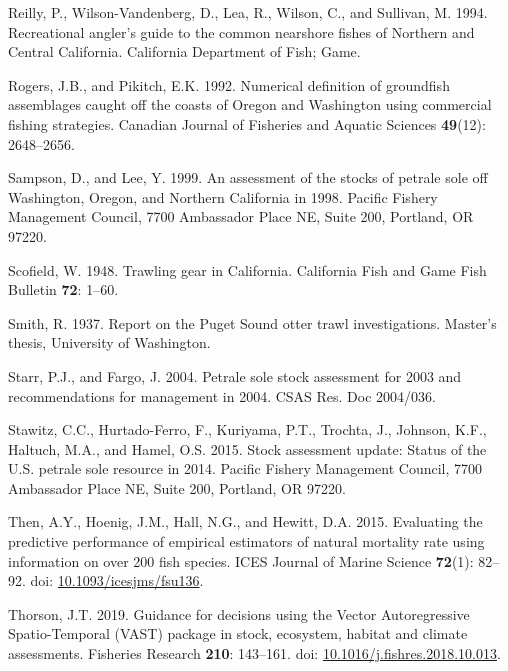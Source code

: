 \documentclass[12pt,]{article}
\begin{document}
\hypertarget{ref-reilly_recreational_1994}{}
Reilly, P., Wilson-Vandenberg, D., Lea, R., Wilson, C., and Sullivan, M.
1994. Recreational angler's guide to the common nearshore fishes of
Northern and Central California. California Department of Fish; Game.

\hypertarget{ref-rogers_numerical_1992}{}
Rogers, J.B., and Pikitch, E.K. 1992. Numerical definition of groundfish
assemblages caught off the coasts of Oregon and Washington using
commercial fishing strategies. Canadian Journal of Fisheries and Aquatic
Sciences \textbf{49}(12): 2648--2656.

\hypertarget{ref-sampson_assessment_1999}{}
Sampson, D., and Lee, Y. 1999. An assessment of the stocks of petrale
sole off Washington, Oregon, and Northern California in 1998. Pacific
Fishery Management Council, 7700 Ambassador Place NE, Suite 200,
Portland, OR 97220.

\hypertarget{ref-scofield_trawling_1948}{}
Scofield, W. 1948. Trawling gear in California. California Fish and Game
Fish Bulletin \textbf{72}: 1--60.

\hypertarget{ref-smith_report_1937}{}
Smith, R. 1937. Report on the Puget Sound otter trawl investigations.
Master's thesis, University of Washington.

\hypertarget{ref-starr_petrale_2004}{}
Starr, P.J., and Fargo, J. 2004. Petrale sole stock assessment for 2003
and recommendations for management in 2004. CSAS Res. Doc 2004/036.

\hypertarget{ref-stawitz_stock_2015}{}
Stawitz, C.C., Hurtado-Ferro, F., Kuriyama, P.T., Trochta, J., Johnson,
K.F., Haltuch, M.A., and Hamel, O.S. 2015. Stock assessment update:
Status of the U.S. petrale sole resource in 2014. Pacific Fishery
Management Council, 7700 Ambassador Place NE, Suite 200, Portland, OR
97220.

\hypertarget{ref-then_evaluating_2015}{}
Then, A.Y., Hoenig, J.M., Hall, N.G., and Hewitt, D.A. 2015. Evaluating
the predictive performance of empirical estimators of natural mortality
rate using information on over 200 fish species. ICES Journal of Marine
Science \textbf{72}(1): 82--92. doi:
\href{https://doi.org/10.1093/icesjms/fsu136}{10.1093/icesjms/fsu136}.

\hypertarget{ref-thorson_guidance_2019}{}
Thorson, J.T. 2019. Guidance for decisions using the Vector
Autoregressive Spatio-Temporal (VAST) package in stock, ecosystem,
habitat and climate assessments. Fisheries Research \textbf{210}:
143--161. doi:
\href{https://doi.org/10.1016/j.fishres.2018.10.013}{10.1016/j.fishres.2018.10.013}.
\end{document}
